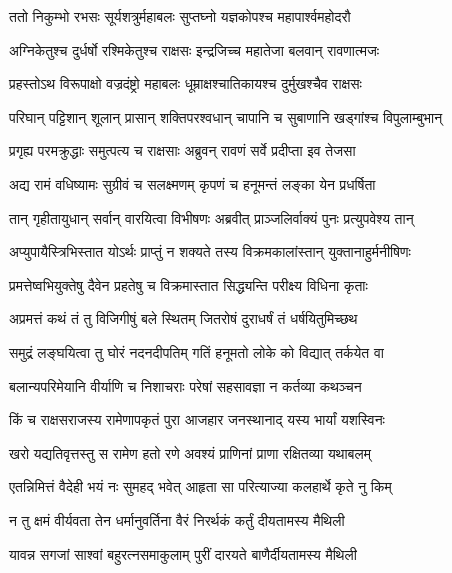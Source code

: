 
\twolineshloka
{ततो निकुम्भो रभसः सूर्यशत्रुर्महाबलः}
{सुप्तघ्नो यज्ञकोपश्च महापार्श्वमहोदरौ} %

\twolineshloka
{अग्निकेतुश्च दुर्धर्षो रश्मिकेतुश्च राक्षसः}
{इन्द्रजिच्च महातेजा बलवान् रावणात्मजः} %

\twolineshloka
{प्रहस्तोऽथ विरूपाक्षो वज्रदंष्ट्रो महाबलः}
{धूम्राक्षश्चातिकायश्च दुर्मुखश्चैव राक्षसः} %

\twolineshloka
{परिघान् पट्टिशान् शूलान् प्रासान् शक्तिपरश्वधान्}
{चापानि च सुबाणानि खड्गांश्च विपुलाम्बुभान्} %

\twolineshloka
{प्रगृह्य परमक्रुद्धाः समुत्पत्य च राक्षसाः}
{अब्रुवन् रावणं सर्वे प्रदीप्ता इव तेजसा} %

\twolineshloka
{अद्य रामं वधिष्यामः सुग्रीवं च सलक्ष्मणम्}
{कृपणं च हनूमन्तं लङ्का येन प्रधर्षिता} %

\twolineshloka
{तान् गृहीतायुधान् सर्वान् वारयित्वा विभीषणः}
{अब्रवीत् प्राञ्जलिर्वाक्यं पुनः प्रत्युपवेश्य तान्} %

\twolineshloka
{अप्युपायैस्त्रिभिस्तात योऽर्थः प्राप्तुं न शक्यते}
{तस्य विक्रमकालांस्तान् युक्तानाहुर्मनीषिणः} %

\twolineshloka
{प्रमत्तेष्वभियुक्तेषु दैवेन प्रहतेषु च}
{विक्रमास्तात सिद्ध्यन्ति परीक्ष्य विधिना कृताः} %

\twolineshloka
{अप्रमत्तं कथं तं तु विजिगीषुं बले स्थितम्}
{जितरोषं दुराधर्षं तं धर्षयितुमिच्छथ} %

\twolineshloka
{समुद्रं लङ्घयित्वा तु घोरं नदनदीपतिम्}
{गतिं हनूमतो लोके को विद्यात् तर्कयेत वा} %

\twolineshloka
{बलान्यपरिमेयानि वीर्याणि च निशाचराः}
{परेषां सहसावज्ञा न कर्तव्या कथञ्चन} %

\twolineshloka
{किं च राक्षसराजस्य रामेणापकृतं पुरा}
{आजहार जनस्थानाद् यस्य भार्यां यशस्विनः} %

\twolineshloka
{खरो यद्यतिवृत्तस्तु स रामेण हतो रणे}
{अवश्यं प्राणिनां प्राणा रक्षितव्या यथाबलम्} %

\twolineshloka
{एतन्निमित्तं वैदेही भयं नः सुमहद् भवेत्}
{आहृता सा परित्याज्या कलहार्थे कृते नु किम्} %

\twolineshloka
{न तु क्षमं वीर्यवता तेन धर्मानुवर्तिना}
{वैरं निरर्थकं कर्तुं दीयतामस्य मैथिली} %

\twolineshloka
{यावन्न सगजां साश्वां बहुरत्नसमाकुलाम्}
{पुरीं दारयते बाणैर्दीयतामस्य मैथिली} %

